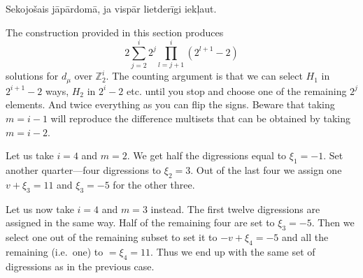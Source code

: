 Sekojošais jāpārdomā, ja vispār lietderīgi iekļaut.

The construction provided in this section produces
\begin{equation}
    2 \sum\limits_{j=2}^i 2^j \prod\limits_{l=j+1}^i (2^{l+1}-2)
\end{equation}
solutions for $d_\mu$ over $\mathbb Z_2^i$. The counting argument is that we can select $H_1$ in $2^{i+1}-2$ ways, $H_2$ in $2^i-2$ etc. until you stop and choose one of the remaining $2^j$ elements. And twice everything as you can flip the signs. Beware that taking $m=i-1$ will reproduce the difference multisets that can be obtained by taking $m=i-2$.

\begin{example}
    Let us take $i=4$ and $m=2$. We get half the digressions equal to $\xi_1=-1$. Set another quarter---four digressions to $\xi_2=3$. Out of the last four we assign one $v+\xi_3=11$ and $\xi_3=-5$ for the other three.
    
    Let us now take $i=4$ and $m=3$ instead. The first twelve digressions are assigned in the same way. Half of the remaining four are set to $\xi_3=-5$. Then we select one out of the remaining subset to set it to $-v+\xi_4=-5$ and all the remaining (i.e.\ one) to $=\xi_4=11$. Thus we end up with the same set of digressions as in the previous case.
\end{example}
